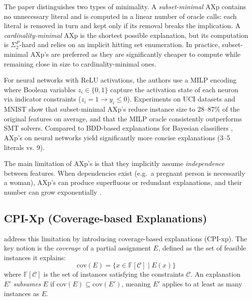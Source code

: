 The paper distinguishes two types of minimality. A \emph{subset-minimal} AXp
contains no unnecessary literal and is computed in a linear number of oracle calls:
each literal is removed in turn and kept only if its removal breaks the implication.
A \emph{cardinality-minimal} AXp is the shortest possible explanation, but its
computation is $\Sigma_2^P$-hard and relies on an implicit hitting set enumeration.
In practice, subset-minimal AXp's are preferred as they are significantly cheaper
to compute while remaining close in size to cardinality-minimal ones.

For neural networks with ReLU activations, the authors use a MILP encoding where
Boolean variables $z_i \in \{0,1\}$ capture the activation state of each neuron via
indicator constraints ($z_i = 1 \to y_i \leq 0$). Experiments on UCI datasets and
MNIST show that subset-minimal AXp's reduce instance size to 28--87\% of the
original features on average, and that the MILP oracle consistently outperforms SMT
solvers. Compared to BDD-based explanations for Bayesian classifiers
\textcite{shih_symbolic_2018}, AXp's on neural networks yield significantly
more concise explanations (3--5 literals vs. 9).

The main limitation of AXp's is that they implicitly assume \emph{independence}
between features. When dependencies exist (e.g.\ a pregnant person is necessarily a
woman), AXp's can produce superfluous or redundant explanations, and their number
can grow exponentially \cite{cooper_abductive_2024}.

\subsection{CPI-Xp (Coverage-based Explanations)}

\textcite{cooper_abductive_2024} address this limitation by introducing coverage-based explanations (CPI-xp). 
The key notion is the \emph{coverage} of a partial assignment $E$, defined as the set of feasible
instances it explains:
    \begin{equation}
        \mathrm{cov}(E) = \{x \in \mathbb{F}[\mathcal{C}] \mid E(x)\}
    \end{equation}
where $\mathbb{F}[\mathcal{C}]$ is the set of instances satisfying the constraints
$\mathcal{C}$. An explanation $E'$ \emph{subsumes} $E$ if
$\mathrm{cov}(E) \subseteq \mathrm{cov}(E')$, meaning $E'$ applies to at least as
many instances as $E$.

